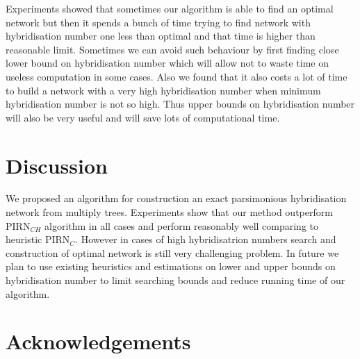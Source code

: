 \documentclass[runningheads, envcountsame, a4paper]{llncs}
\begin{document}
Experiments showed that sometimes our algorithm is able to find an optimal network but then it spends a bunch of time trying to find network 
with hybridisation number one less than optimal and that time is higher than reasonable limit. Sometimes we can avoid such behaviour by 
first finding close lower bound on hybridisation number which will allow not to waste time on useless computation in some cases. Also we found 
that it also costs a lot of time to build a network with a very high hybridisation number when minimum hybridisation number is not so high. 
Thus upper bounds on hybridisation number will also be very useful and will save lots of computational time.

\section{Discussion}

We proposed an algorithm for construction an exact parsimonious hybridisation network from multiply trees. Experiments show that our method outperform PIRN$_{CH}$ algorithm in all cases and perform reasonably well comparing to heuristic PIRN$_C$. However in cases of high hybridisatrion numbers search and construction of optimal network  is still very challenging problem. In future we plan to use existing 
heuristics and estimations on lower and upper bounds on hybridisation number to limit searching bounds and reduce running time of our algorithm.

\section*{Acknowledgements}



\clearpage
\end{document}

